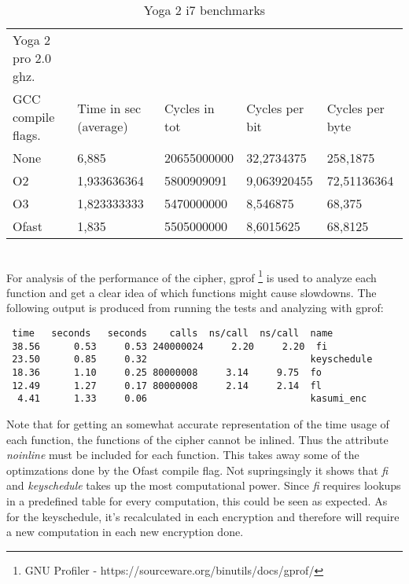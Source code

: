 \begin{table}[h!]
    \begin{tabular}{l|l|l|l|l}
     Yoga 2 pro 2.0 ghz. & ~                     & ~             & ~              & ~               \\
    GCC compile flags.   & Time in sec (average) & Cycles in tot & Cycles per bit & Cycles per byte \\ \hline
    None                 & 6,885                 & 20655000000   & 32,2734375     & 258,1875        \\ \hline
    O2                   & 1,933636364           & 5800909091    & 9,063920455    & 72,51136364     \\ \hline
    O3                   & 1,823333333           & 5470000000    & 8,546875       & 68,375          \\ \hline
    Ofast                & 1,835                 & 5505000000    & 8,6015625      & 68,8125         \\
    \end{tabular}
    \caption{Yoga 2 i7 benchmarks}
    \label{tab:yoga}
\end{table}\\


For analysis of the performance of the cipher, gprof \footnote{GNU
  Profiler - https://sourceware.org/binutils/docs/gprof/} is used to
analyze each function and get a clear idea of which functions might
cause slowdowns. The following output is produced from running the
tests and analyzing with gprof:
\begin{lstlisting}[caption=Gprof output,captionpos=b,label=lst:grpof]
    %   cumulative   self              self     total
 time   seconds   seconds    calls  ns/call  ns/call  name
 38.56      0.53     0.53 240000024     2.20     2.20  fi
 23.50      0.85     0.32                             keyschedule
 18.36      1.10     0.25 80000008     3.14     9.75  fo
 12.49      1.27     0.17 80000008     2.14     2.14  fl
  4.41      1.33     0.06                             kasumi_enc
\end{lstlisting}
Note that for getting an somewhat accurate representation of the time usage of
each function, the functions of the cipher cannot be inlined. Thus the
attribute \textit{noinline} must be included for each function. This
takes away some of the optimzations done by the Ofast compile
flag. Not supringsingly it shows that \textit{fi} and
\textit{keyschedule} takes up the most computational
power. Since \textit{fi} requires lookups in a predefined table for every computation, this
could be seen as expected. As for the keyschedule, it's recalculated
in each encryption and therefore will require a new computation in
each new encryption done.

